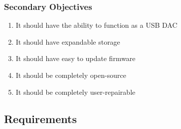 \documentclass{article}
\begin{document}
\subsubsection{Secondary Objectives}
\begin{enumerate}
    \item It should have the ability to function as a USB DAC
    \item It should have expandable storage
    \item It should have easy to update firmware
    \item It should be completely open-source
    \item It should be completely user-repairable
\end{enumerate}

\subsection{Requirements}
\end{document}
